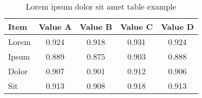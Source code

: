 \begin{table}[ht]
    \caption{Lorem ipsum dolor sit amet table example}
    \label{tab:example}
    \begin{center}
        \begin{tabular}{lcccc}
            \toprule
            Item  & Value A & Value B & Value C & Value D \\
            \midrule \midrule
            Lorem & 0.924   & 0.918   & 0.931   & 0.924   \\
            Ipsum & 0.889   & 0.875   & 0.903   & 0.888   \\
            Dolor & 0.907   & 0.901   & 0.912   & 0.906   \\
            Sit   & 0.913   & 0.908   & 0.918   & 0.913   \\
            \bottomrule
        \end{tabular}
    \end{center}
\end{table}
